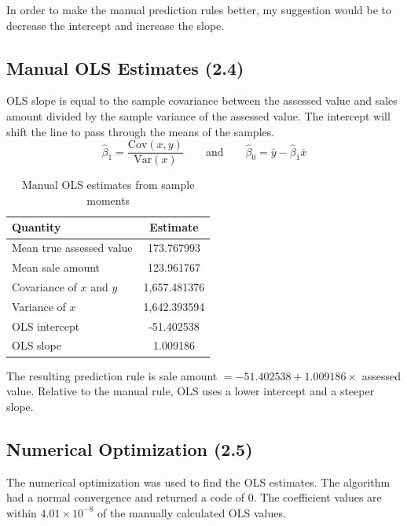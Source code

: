 \documentclass[11pt]{article}
\begin{document}
In order to make the manual prediction rules better, my suggestion would be to decrease the intercept and increase the slope.

\subsection{Manual OLS Estimates (2.4)}

OLS slope is equal to the sample covariance between the assessed value and sales amount divided by the sample variance of the assessed value. The intercept will shift the line to pass through the means of the samples.
\[
\hat{\beta}_1 = \frac{\text{Cov}(x, y)}{\text{Var}(x)} \qquad \text{and} \qquad \hat{\beta}_0 = \bar{y} - \hat{\beta}_1 \bar{x}
\]

\begin{table}[h]
\centering
\caption{Manual OLS estimates from sample moments}
\begin{tabular}{lc}
\toprule
Quantity & Estimate \\
\midrule
Mean true assessed value & 173.767993 \\
Mean sale amount & 123.961767 \\
Covariance of $x$ and $y$ & 1{,}657.481376 \\
Variance of $x$ & 1{,}642.393594 \\
OLS intercept & -51.402538 \\
OLS slope & 1.009186 \\
\bottomrule
\end{tabular}
\end{table}

The resulting prediction rule is sale amount $= -51.402538 + 1.009186 \times$ assessed value. Relative to the manual rule, OLS uses a lower intercept and a steeper slope.

\subsection{Numerical Optimization (2.5)}

The numerical optimization was used to find the OLS estimates. The algorithm had a normal convergence and returned a code of 0. The coefficient values are within $4.01\times10^{-8}$ of the manually calculated OLS values.
\end{document}
